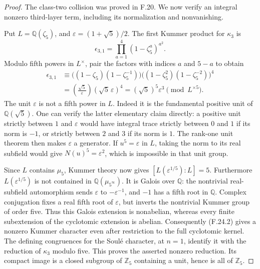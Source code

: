 \begin{proof}
The class-two collision was proved in F.20. We now
verify an integral nonzero third-layer term, including
its normalization and nonvanishing.

Put \(L=\mathbb Q(\zeta_5)\), and
\(\varepsilon=(1+\sqrt5)/2\).
The first Kummer product for \(\kappa_3\) is
\[
               \epsilon_{3,1}
                   =\prod_{a=1}^4(1-\zeta_5^a)^{a^2}.
\]
Modulo fifth powers in \(L^\times\), pair the factors
with indices \(a\) and \(5-a\) to obtain
\[
\begin{split}
 \epsilon_{3,1}
 &\equiv
 \bigl((1-\zeta_5)(1-\zeta_5^{-1})\bigr)
 \bigl((1-\zeta_5^2)(1-\zeta_5^{-2})\bigr)^4\\
 &=\left(\frac{\sqrt5}{\varepsilon}\right)
                   (\sqrt5\,\varepsilon)^4
   =(\sqrt5)^5\varepsilon^3
                 \pmod{L^{\times5}}.                        \tag{F.24.2}
\end{split}
\]
The unit \(\varepsilon\) is not a fifth power in \(L\).
Indeed it is the fundamental positive unit of
\(\mathbb Q(\sqrt5)\). One can verify the latter
elementary claim directly: a positive unit strictly
between \(1\) and \(\varepsilon\) would have integral
trace strictly between \(0\) and \(1\) if its norm is
\(-1\), or strictly between \(2\) and \(3\) if its norm
is \(1\). The rank-one unit theorem then makes
\(\varepsilon\) a generator. If \(u^5=\varepsilon\)
in \(L\), taking the norm to its real subfield would
give \(N(u)^5=\varepsilon^2\), which is impossible
in that unit group.

Since \(L\) contains \(\mu_5\), Kummer theory now gives
\([L(\varepsilon^{1/5}):L]=5\).
Furthermore \(L(\varepsilon^{1/5})\) is not contained
in \(\mathbb Q(\mu_{5^\infty})\). It is Galois over
\(\mathbb Q\): the nontrivial real-subfield
automorphism sends \(\varepsilon\) to
\(-\varepsilon^{-1}\), and \(-1\) has a fifth root
in \(\mathbb Q\). Complex conjugation fixes a real
fifth root of \(\varepsilon\), but inverts the
nontrivial Kummer group of order five. Thus this
Galois extension is nonabelian, whereas every finite
subextension of the cyclotomic extension is abelian.
Consequently (F.24.2) gives a nonzero Kummer character
even after restriction to the full cyclotomic kernel.
The defining congruences for the Soulé character,
at \(n=1\), identify it with the reduction of
\(\kappa_3\) modulo five. This proves the asserted
nonzero reduction. Its compact image is a closed
subgroup of \(\mathbb Z_5\) containing a unit, hence
is all of \(\mathbb Z_5\).


\end{proof}
